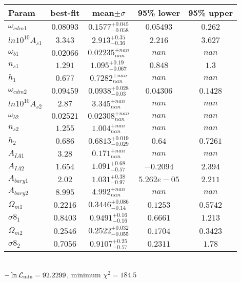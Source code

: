 \begin{tabular}{|l|c|c|c|c|} 
 \hline 
Param & best-fit & mean$\pm\sigma$ & 95\% lower & 95\% upper \\ \hline 
$\omega_{cdm 1 }$ &$0.08093$ & $0.1577_{-0.058}^{+0.045}$ & $0.05493$ & $0.262$ \\ 
$ln10^{10}A_{s 1 }$ &$3.343$ & $2.913_{-0.36}^{+0.35}$ & $2.216$ & $3.627$ \\ 
$\omega_{b 1 }$ &$0.02066$ & $0.02235_{nan}^{+nan}$ & $nan$ & $nan$ \\ 
$n_{s 1 }$ &$1.291$ & $1.095_{-0.067}^{+0.19}$ & $0.848$ & $1.3$ \\ 
$h_{1 }$ &$0.677$ & $0.7282_{nan}^{+nan}$ & $nan$ & $nan$ \\ 
$\omega_{cdm 2 }$ &$0.09459$ & $0.0938_{-0.03}^{+0.028}$ & $0.04306$ & $0.1428$ \\ 
$ln10^{10}A_{s 2 }$ &$2.87$ & $3.345_{nan}^{+nan}$ & $nan$ & $nan$ \\ 
$\omega_{b 2 }$ &$0.02521$ & $0.02308_{nan}^{+nan}$ & $nan$ & $nan$ \\ 
$n_{s 2 }$ &$1.255$ & $1.004_{nan}^{+nan}$ & $nan$ & $nan$ \\ 
$h_{2 }$ &$0.686$ & $0.6813_{-0.029}^{+0.019}$ & $0.64$ & $0.7261$ \\ 
$A_{IA 1 }$ &$3.28$ & $0.171_{nan}^{+nan}$ & $nan$ & $nan$ \\ 
$A_{IA 2 }$ &$1.654$ & $1.091_{-0.57}^{+0.68}$ & $-0.2094$ & $2.394$ \\ 
$A_{bary 1 }$ &$2.02$ & $1.031_{-0.97}^{+0.38}$ & $5.262e-05$ & $2.211$ \\ 
$A_{bary 2 }$ &$8.995$ & $4.992_{nan}^{+nan}$ & $nan$ & $nan$ \\ 
$\Omega_{m 1 }$ &$0.2216$ & $0.3446_{-0.14}^{+0.086}$ & $0.1253$ & $0.5742$ \\ 
$\sigma8_{1 }$ &$0.8403$ & $0.9491_{-0.16}^{+0.16}$ & $0.6661$ & $1.213$ \\ 
$\Omega_{m 2 }$ &$0.2546$ & $0.2522_{-0.055}^{+0.032}$ & $0.1704$ & $0.3423$ \\ 
$\sigma8_{2 }$ &$0.7056$ & $0.9107_{-0.57}^{+0.25}$ & $0.2311$ & $1.78$ \\ 
\hline 
 \end{tabular} \\ 
$-\ln{\cal L}_\mathrm{min} =92.2299$, minimum $\chi^2=184.5$ \\ 
